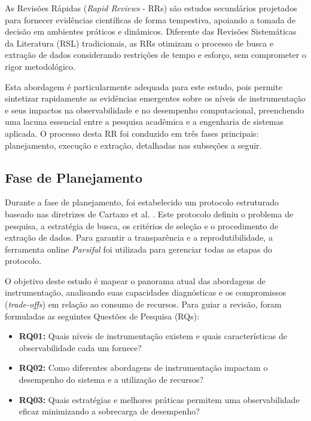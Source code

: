 \documentclass[sigconf, anonymous]{acmart}
\begin{document}
As Revisões Rápidas (\textit{Rapid Reviews} - RRs) são estudos secundários projetados para fornecer evidências científicas de forma tempestiva, apoiando a tomada de decisão em ambientes práticos e dinâmicos. Diferente das Revisões Sistemáticas da Literatura (RSL) tradicionais, as RRs otimizam o processo de busca e extração de dados considerando restrições de tempo e esforço, sem comprometer o rigor metodológico. 

Esta abordagem é particularmente adequada para este estudo, pois permite sintetizar rapidamente as evidências emergentes sobre os níveis de instrumentação e seus impactos na observabilidade e no desempenho computacional, preenchendo uma lacuna essencial entre a pesquisa acadêmica e a engenharia de sistemas aplicada. O processo desta RR foi conduzido em três fases principais: planejamento, execução e extração, detalhadas nas subseções a seguir.

\subsection{Fase de Planejamento}

Durante a fase de planejamento, foi estabelecido um protocolo estruturado baseado nas diretrizes de Cartaxo et al. \cite{cartaxo_2018}. Este protocolo definiu o problema de pesquisa, a estratégia de busca, os critérios de seleção e o procedimento de extração de dados. Para garantir a transparência e a reprodutibilidade, a ferramenta online \textit{Parsifal} foi utilizada para gerenciar todas as etapas do protocolo.

O objetivo deste estudo é mapear o panorama atual das abordagens de instrumentação, analisando suas capacidades diagnósticas e os compromissos (\textit{trade-offs}) em relação ao consumo de recursos. Para guiar a revisão, foram formuladas as seguintes Questões de Pesquisa (RQs):

\begin{itemize}
    \item \textbf{RQ01:} Quais níveis de instrumentação existem e quais características de observabilidade cada um fornece?
    \item \textbf{RQ02:} Como diferentes abordagens de instrumentação impactam o desempenho do sistema e a utilização de recursos?
    \item \textbf{RQ03:} Quais estratégias e melhores práticas permitem uma observabilidade eficaz minimizando a sobrecarga de desempenho?
\end{itemize}
\end{document}
